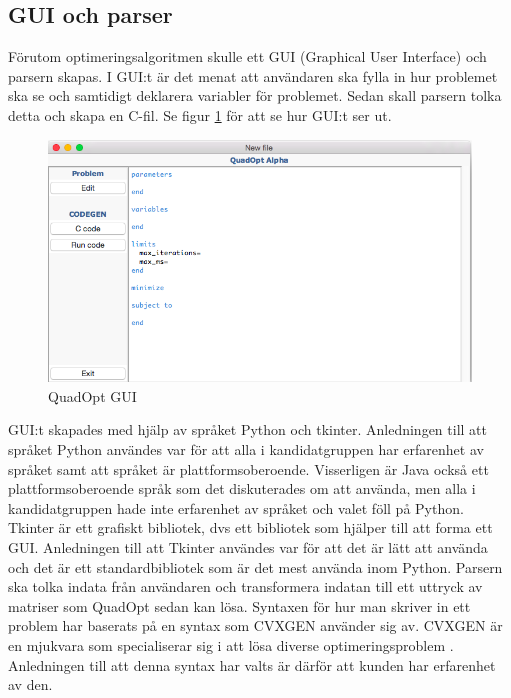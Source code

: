 \subsection{GUI och parser}
Förutom optimeringsalgoritmen skulle ett GUI (Graphical User Interface) och parsern skapas. I GUI:t är det menat att användaren ska fylla in hur problemet ska se och samtidigt deklarera variabler för problemet. Sedan skall parsern tolka detta och skapa en C-fil. Se figur \ref{fig:quadoptgui} för att se hur GUI:t ser ut.
\begin{figure}[H]
\centerline{\includegraphics[scale=0.58]{grafik/QuadOptGUI}}
\caption{QuadOpt GUI}
\label{fig:quadoptgui}
\end{figure}
GUI:t skapades med hjälp av språket Python och tkinter. Anledningen till att språket Python användes var för att alla i kandidatgruppen har erfarenhet av språket samt att språket är plattformsoberoende. Visserligen är Java också ett plattformsoberoende språk som det diskuterades om att använda, men alla i kandidatgruppen hade inte erfarenhet av språket och valet föll på Python.
\newline
\newline
Tkinter är ett grafiskt bibliotek, dvs ett bibliotek som hjälper till att forma ett GUI. Anledningen till att Tkinter användes var för att det är lätt att använda och det är ett standardbibliotek som är det mest använda inom Python.
\newline
\newline
Parsern ska tolka indata från användaren och transformera indatan till ett uttryck av matriser som QuadOpt sedan kan lösa. Syntaxen för hur man skriver in ett problem har baserats på en syntax som CVXGEN använder sig av. CVXGEN är en mjukvara som specialiserar sig i att lösa diverse optimeringsproblem \cite{cvxgen}. Anledningen till att denna syntax har valts är därför att kunden har erfarenhet av den.
 
